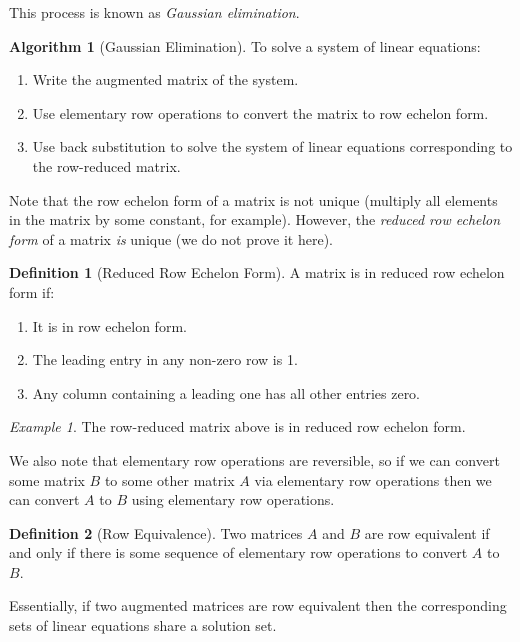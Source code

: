 \documentclass[10pt, a4paper]{amsart}
\theoremstyle{definition}
\newtheorem{defn}{Definition}
\newtheorem{alg}{Algorithm}
\theoremstyle{remark}
\newtheorem{ex}{Example}
\begin{document}
This process is known as \emph{Gaussian elimination}.
\begin{alg}[Gaussian Elimination]
  To solve a system of linear equations:
  \begin{enumerate}
    \item Write the augmented matrix of the system.
    \item Use elementary row operations to convert the matrix to row echelon form.
    \item Use back substitution to solve the system of linear equations corresponding
          to the row-reduced matrix.
  \end{enumerate}
\end{alg}

Note that the row echelon form of a matrix is not unique (multiply all elements
in the matrix by some constant, for example). However, the \emph{reduced row
echelon form} of a matrix \emph{is} unique (we do not prove it here).

\begin{defn}[Reduced Row Echelon Form]
  A matrix is in reduced row echelon form if:
  \begin{enumerate}
    \item It is in row echelon form.
    \item The leading entry in any non-zero row is 1.
    \item Any column containing a leading one has all other
          entries zero.
  \end{enumerate}
\end{defn}

\begin{ex}
  The row-reduced matrix above is in reduced row echelon form.
\end{ex}

We also note that elementary row operations are reversible, so
if we can convert some matrix $ B $ to some other matrix $ A $ via elementary
row operations then we can convert $ A $ to $ B $ using elementary row
operations.

\begin{defn}[Row Equivalence]
  Two matrices $ A $ and $ B $ are row equivalent if and only if there
  is some sequence of elementary row operations to convert $ A $ to $ B $.
\end{defn}

Essentially, if two augmented matrices are row equivalent then the corresponding
sets of linear equations share a solution set.
\end{document}
